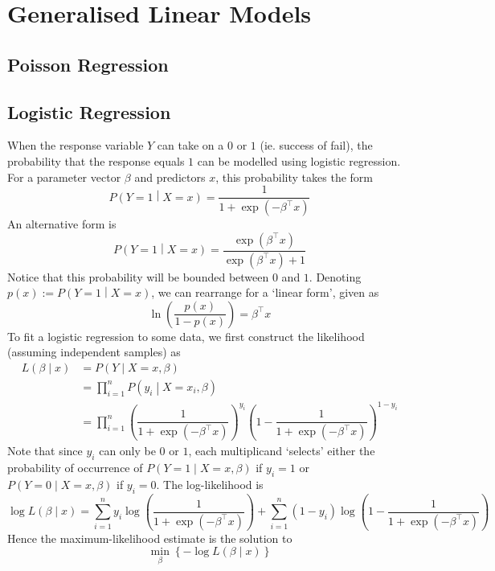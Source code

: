 \documentclass[11pt]{report} %
\begin{document}
\section{Generalised Linear Models}

\subsection{Poisson Regression}

\subsection{Logistic Regression}

When the response variable $Y$ can take on a $0$ or $1$ (ie. success of fail), the probability that the response equals $1$ can be modelled using logistic regression. For a parameter vector $\beta$ and predictors $x$, this probability takes the form
\begin{equation}
P\left(Y = 1\middle| X = x\right) = \dfrac{1}{1 + \exp\left(-\beta^{\top}x\right)}
\end{equation}
An alternative form is
\begin{equation}
P\left(Y = 1\middle| X = x\right) = \dfrac{\exp\left(\beta^{\top}x\right)}{\exp\left(\beta^{\top}x\right) + 1}
\end{equation}
Notice that this probability will be bounded between $0$ and $1$. Denoting $p\left(x\right) := P\left(Y = 1\middle| X = x\right)$, we can rearrange for a `linear form', given as
\begin{equation}
\ln\left(\dfrac{p\left(x\right)}{1 - p\left(x\right)}\right) = \beta^{\top}x
\end{equation}
To fit a logistic regression to some data, we first construct the likelihood (assuming independent samples) as
\begin{align}
L\left(\beta\middle|x\right) &= P\left(Y\middle|X = x, \beta\right) \\
&= \prod_{i = 1}^{n} P\left(y_{i}\middle|X = x_{i}, \beta\right) \\
&= \prod_{i = 1}^{n} \left(\dfrac{1}{1 + \exp\left(-\beta^{\top}x\right)}\right)^{y_{i}}\left(1 - \dfrac{1}{1 + \exp\left(-\beta^{\top}x\right)}\right)^{1 - y_{i}}
\end{align}
Note that since $y_{i}$ can only be $0$ or $1$, each multiplicand `selects' either the probability of occurrence of $P\left(Y = 1\middle|X = x, \beta\right)$ if $y_{i} = 1$ or $P\left(Y = 0\middle|X = x, \beta\right)$ if $y_{i} = 0$. The log-likelihood is
\begin{equation}
\log L\left(\beta\middle|x\right) = \sum_{i = 1}^{n} y_{i}\log\left(\dfrac{1}{1 + \exp\left(-\beta^{\top}x\right)}\right) + \sum_{i = 1}^{n}\left(1 - y_{i}\right)\log\left(1 - \dfrac{1}{1 + \exp\left(-\beta^{\top}x\right)}\right)
\end{equation}
Hence the maximum-likelihood estimate is the solution to
\begin{equation}
\min_{\beta} \left\{-\log L\left(\beta\middle|x\right)\right\}
\end{equation}
\end{document}
